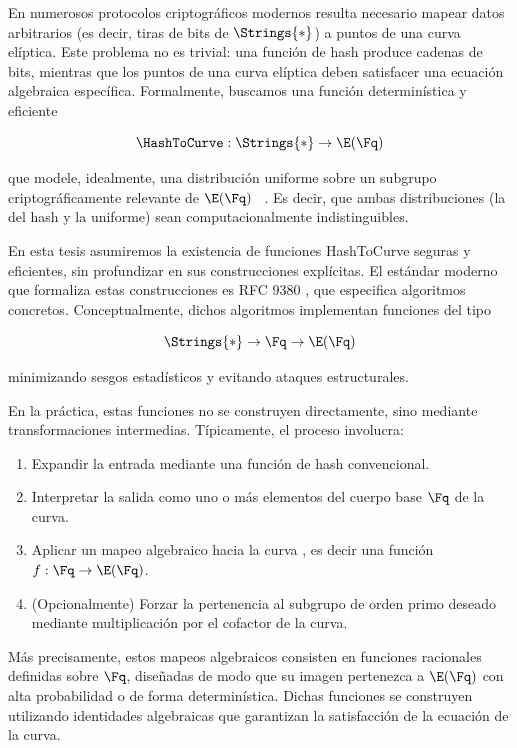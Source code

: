 En numerosos protocolos criptográficos modernos resulta necesario mapear datos arbitrarios (es decir, tiras de bits de $\Strings{*}$) a puntos de una curva elíptica. Este problema no es trivial: una función de hash produce cadenas de bits, mientras que los puntos de una curva elíptica deben satisfacer una ecuación algebraica específica. Formalmente, buscamos una función determinística y eficiente

$$\HashToCurve : \Strings{*} \to \E(\Fq)$$

que modele, idealmente, una distribución uniforme sobre un subgrupo criptográficamente relevante de $\E(\Fq)$  \cite{Fouque2012, Wahby2019}. Es decir, que ambas distribuciones (la del hash y la uniforme) sean computacionalmente indistinguibles.

En esta tesis asumiremos la existencia de funciones HashToCurve seguras y eficientes, sin profundizar en sus construcciones explícitas. El estándar moderno que formaliza estas construcciones es RFC 9380 \cite{rfc9380}, que especifica algoritmos concretos. Conceptualmente, dichos algoritmos implementan funciones del tipo

$$\Strings{*} \to \Fq \to \E(\Fq)$$

minimizando sesgos estadísticos \cite{Fouque2012} y evitando ataques estructurales.

En la práctica, estas funciones no se construyen directamente, sino mediante transformaciones intermedias. Típicamente, el proceso involucra:

\begin{enumerate}[noitemsep]
	\item Expandir la entrada mediante una función de hash convencional.
	\item Interpretar la salida como uno o más elementos del cuerpo base $\Fq$ de la curva.
	\item Aplicar un mapeo algebraico hacia la curva \cite{Wahby2019, cryptoeprint:2013/325}, es decir una función $f: \Fq \to \E(\Fq)$.
	\item (Opcionalmente) Forzar la pertenencia al subgrupo de orden primo deseado mediante multiplicación por el cofactor de la curva.
\end{enumerate}

Más precisamente, estos mapeos algebraicos consisten en funciones racionales definidas sobre $\Fq$, diseñadas de modo que su imagen pertenezca a $\E(\Fq)$ con alta probabilidad o de forma determinística. Dichas funciones se construyen utilizando identidades algebraicas que garantizan la satisfacción de la ecuación de la curva.

